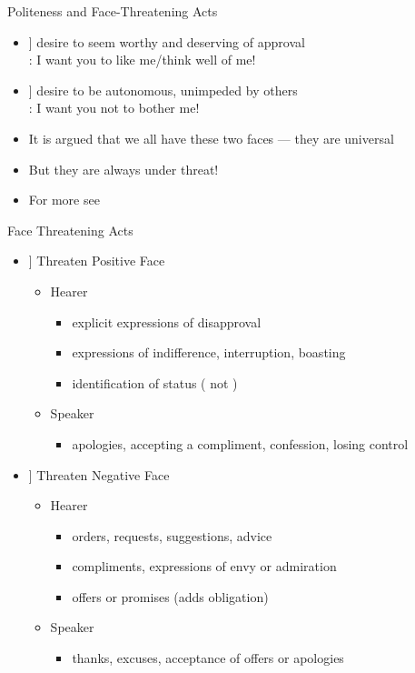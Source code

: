 \documentclass{beamer}
\newcommand{\PF}[1]{\Smiley[#1][green]}
\newcommand{\NF}[1]{\Annoey[#1][red]}
\begin{document}
\begin{frame}{Politeness and Face-Threatening Acts}

\begin{itemize}
\item[\PF{2}]  desire to seem worthy and deserving of approval
  \\ : I want you to like me/think well of me!
\bigskip\bigskip\bigskip
\item[\NF{2}]  desire to be autonomous, unimpeded by others
  \\ : I want you not to bother me!
\bigskip\bigskip\bigskip
\item It is argued that we all have these two faces --- they are universal
\item But they are always under threat!
\item For more see \citet{Brown:Levinson:1987}

\end{itemize}
\end{frame}

\begin{frame}{Face Threatening Acts}

\begin{itemize}
\item[\PF{1}] Threaten Positive Face
  \begin{itemize}
  \item Hearer
    \begin{itemize}
    \item explicit expressions of disapproval 
    \item expressions of indifference, interruption, boasting
    \item identification of status ( not )
    \end{itemize}
  \item Speaker
    \begin{itemize}
    \item apologies, accepting a compliment, confession, losing control
    \end{itemize}
  \end{itemize}
\item[\NF{1}] Threaten Negative Face
  \begin{itemize}
  \item Hearer
    \begin{itemize}
    \item orders, requests, suggestions, advice
    \item compliments, expressions of envy or admiration
    \item offers or promises (adds obligation)
    \end{itemize}
  \item Speaker
    \begin{itemize}
    \item thanks, excuses, acceptance of offers or apologies
    \end{itemize}
  \end{itemize}
\end{itemize}

\end{frame}
\end{document}
